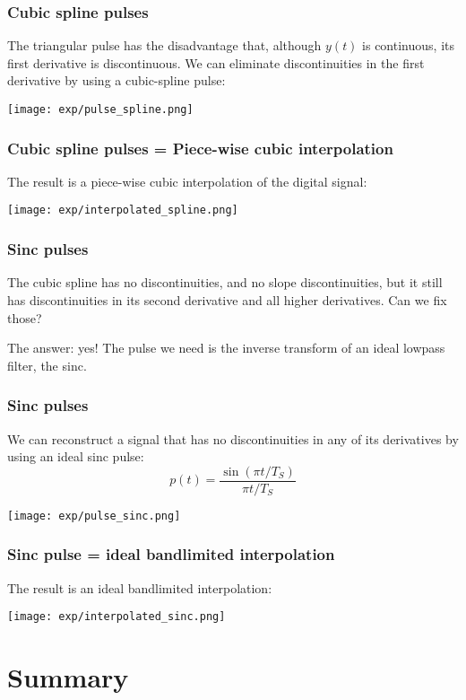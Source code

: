 \documentclass{beamer}
\begin{document}
\begin{frame}
  \frametitle{Cubic spline pulses}

  The triangular pulse has the disadvantage that, although $y(t)$ is continuous, its
  first derivative is discontinuous.  We can eliminate discontinuities in the first derivative
  by using a cubic-spline pulse:
  \centerline{\texttt{[image: exp/pulse\_spline.png]}}  
\end{frame}

\begin{frame}
  \frametitle{Cubic spline pulses = Piece-wise cubic interpolation}

  The result is a  piece-wise cubic interpolation of the digital signal:

  \centerline{\texttt{[image: exp/interpolated\_spline.png]}}  
\end{frame}

\begin{frame}
  \frametitle{Sinc pulses}

  The cubic spline has no discontinuities, and no slope  discontinuities, but it still has
  discontinuities in its second derivative and all higher derivatives.  Can we fix those?

  The answer: yes!  The pulse we need is the inverse transform of an
  ideal lowpass filter, the sinc.
\end{frame}
  
\begin{frame}
  \frametitle{Sinc pulses}

  We can reconstruct a signal that has  no discontinuities in any of its derivatives
  by using an  ideal sinc pulse:
  \begin{displaymath}
    p(t) = \frac{\sin(\pi t/T_S)}{\pi t/T_S}
  \end{displaymath}

  \centerline{\texttt{[image: exp/pulse\_sinc.png]}}  
\end{frame}

\begin{frame}
  \frametitle{Sinc pulse = ideal bandlimited interpolation}

  The result is an ideal bandlimited interpolation:

  \centerline{\texttt{[image: exp/interpolated\_sinc.png]}}  
\end{frame}

\section[Summary]{Summary}
\setcounter{subsection}{1}
\end{document}

